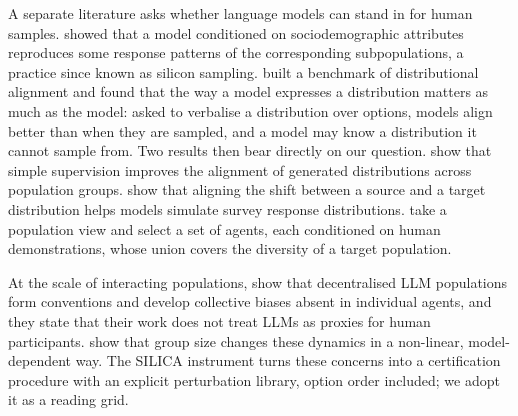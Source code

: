 A separate literature asks whether language models can stand in for human samples. \citet{argyle2023outofone} showed that a model conditioned on sociodemographic attributes reproduces some response patterns of the corresponding subpopulations, a practice since known as silicon sampling. \citet{meister2024benchmarking} built a benchmark of distributional alignment and found that the way a model expresses a distribution matters as much as the model: asked to verbalise a distribution over options, models align better than when they are sampled, and a model may know a distribution it cannot sample from. Two results then bear directly on our question. \citet{kambhatla2025improving} show that simple supervision improves the alignment of generated distributions across population groups. \citet{huang2025distribution} show that aligning the shift between a source and a target distribution helps models simulate survey response distributions. \citet{nguyen2025prompt} take a population view and select a set of agents, each conditioned on human demonstrations, whose union covers the diversity of a target population.

At the scale of interacting populations, \citet{baronchelli2025emergent} show that decentralised LLM populations form conventions and develop collective biases absent in individual agents, and they state that their work does not treat LLMs as proxies for human participants. \citet{baronchelli2026groupsize} show that group size changes these dynamics in a non-linear, model-dependent way. The SILICA instrument \citep{bintareaf2026silica} turns these concerns into a certification procedure with an explicit perturbation library, option order included; we adopt it as a reading grid.
